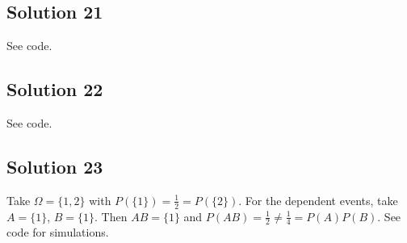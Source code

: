 \subsection*{Solution 21}

See code.


\subsection*{Solution 22}

See code.


\subsection*{Solution 23}

Take $\Omega = \{1, 2\}$ with $P(\{1\}) = \frac{1}{2} = P(\{2\})$.
For the dependent events, take $A = \{1\}$, $B = \{1\}$.
Then $AB = \{1\}$ and $P(AB) = \frac{1}{2} \neq \frac{1}{4} = P(A)P(B)$.
See code for simulations.
